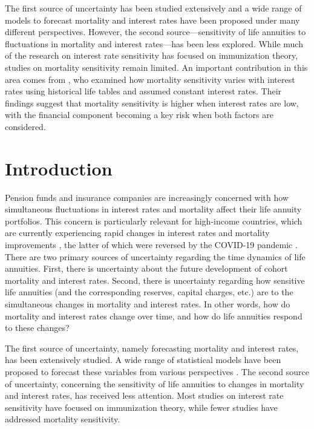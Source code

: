 \documentclass[12pt]{article}
\begin{document}
The first source of uncertainty has been studied extensively and a wide range of models to forecast mortality and interest rates have been proposed under many different perspectives. However, the second source—sensitivity of life annuities to fluctuations in mortality and interest rates—has been less explored. While much of the research on interest rate sensitivity has focused on immunization theory, studies on mortality sensitivity remain limited. An important contribution in this area comes from \citet{rabitti2020mortality}, who examined how mortality sensitivity varies with interest rates using historical life tables and assumed constant interest rates. Their findings suggest that mortality sensitivity is higher when interest rates are low, with the financial component becoming a key risk when both factors are considered.

\section{Introduction}

Pension funds and insurance companies are increasingly concerned with how simultaneous fluctuations in interest rates and mortality affect their life annuity portfolios. This concern is particularly relevant for high-income countries, which are currently experiencing rapid changes in interest rates and mortality improvements \citep{djeundje2022slowdown}, the latter of which were reversed by the COVID-19 pandemic \citep{aburto2022quantifying}. There are two primary sources of uncertainty regarding the time dynamics of life annuities. First, there is uncertainty about the future development of cohort mortality and interest rates. Second, there is uncertainty regarding how sensitive life annuities (and the corresponding reserves, capital charges, etc.) are to the simultaneous changes in mortality and interest rates. In other words, how do mortality and interest rates change over time, and how do life annuities respond to these changes?

The first source of uncertainty, namely forecasting mortality and interest rates, has been extensively studied. A wide range of statistical models have been proposed to forecast these variables from various perspectives \citep{cairns2017modelling,cairns2019modelling,kallestrup2020insight}. The second source of uncertainty, concerning the sensitivity of life annuities to changes in mortality and interest rates, has received less attention. Most studies on interest rate sensitivity have focused on immunization theory, while fewer studies have addressed mortality sensitivity.
\end{document}

